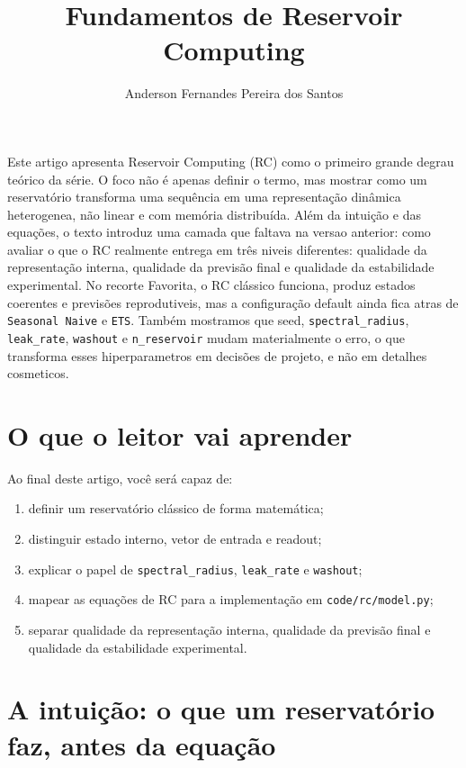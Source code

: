 \documentclass[12pt]{article}
\title{Fundamentos de Reservoir Computing}
\author{Anderson Fernandes Pereira dos Santos}
\providecommand{\tightlist}{%
              \setlength{\itemsep}{0pt}\setlength{\parskip}{0pt}}
\begin{document}
            \maketitle

            \begin{resumo}
            Este artigo apresenta Reservoir Computing (RC) como o primeiro grande degrau teórico da série. O foco não é apenas definir o termo, mas mostrar como um reservatório transforma uma sequência em uma representação dinâmica heterogenea, não linear e com memória distribuída. Além da intuição e das equações, o texto introduz uma camada que faltava na versao anterior: como avaliar o que o RC realmente entrega em três niveis diferentes: qualidade da representação interna, qualidade da previsão final e qualidade da estabilidade experimental. No recorte Favorita, o RC clássico funciona, produz estados coerentes e previsões reprodutiveis, mas a configuração default ainda fica atras de \texttt{Seasonal\ Naive} e \texttt{ETS}. Também mostramos que seed, \texttt{spectral\_radius}, \texttt{leak\_rate}, \texttt{washout} e \texttt{n\_reservoir} mudam materialmente o erro, o que transforma esses hiperparametros em decisões de projeto, e não em detalhes cosmeticos.
            \end{resumo}

            \section{O que o leitor vai aprender}\label{1-o-que-o-leitor-vai-aprender}

Ao final deste artigo, você será capaz de:

\begin{enumerate}
\def\labelenumi{\arabic{enumi}.}
\tightlist
\item
  definir um reservatório clássico de forma matemática;
\item
  distinguir estado interno, vetor de entrada e readout;
\item
  explicar o papel de \texttt{spectral\_radius}, \texttt{leak\_rate} e \texttt{washout};
\item
  mapear as equações de RC para a implementação em \texttt{code/rc/model.py};
\item
  separar qualidade da representação interna, qualidade da previsão final e qualidade da estabilidade experimental.
\end{enumerate}

\section{A intuição: o que um reservatório faz, antes da equação}\label{2-a-intuiuxe7uxe3o-o-que-um-reservatuxf3rio-faz-antes-da-equauxe7uxe3o}
\end{document}
